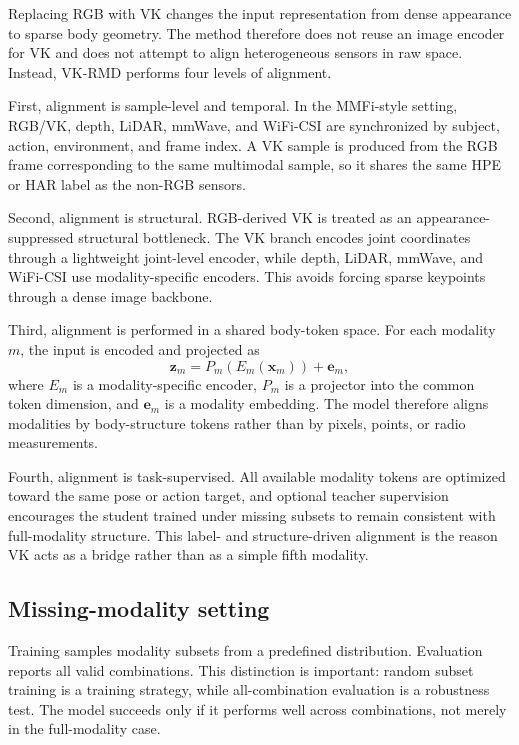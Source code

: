 \documentclass[preprint,12pt]{elsarticle}
\newcommand{\method}{VK-RMD}
\begin{document}
Replacing RGB with VK changes the input representation from dense appearance to sparse body geometry. The method therefore does not reuse an image encoder for VK and does not attempt to align heterogeneous sensors in raw space. Instead, \method{} performs four levels of alignment.

First, alignment is sample-level and temporal. In the MMFi-style setting, RGB/VK, depth, LiDAR, mmWave, and WiFi-CSI are synchronized by subject, action, environment, and frame index. A VK sample is produced from the RGB frame corresponding to the same multimodal sample, so it shares the same HPE or HAR label as the non-RGB sensors.

Second, alignment is structural. RGB-derived VK is treated as an appearance-suppressed structural bottleneck. The VK branch encodes joint coordinates through a lightweight joint-level encoder, while depth, LiDAR, mmWave, and WiFi-CSI use modality-specific encoders. This avoids forcing sparse keypoints through a dense image backbone.

Third, alignment is performed in a shared body-token space. For each modality $m$, the input is encoded and projected as
\begin{equation}
    \mathbf{z}_{m}=P_m(E_m(\mathbf{x}_{m}))+\mathbf{e}_{m},
\end{equation}
where $E_m$ is a modality-specific encoder, $P_m$ is a projector into the common token dimension, and $\mathbf{e}_{m}$ is a modality embedding. The model therefore aligns modalities by body-structure tokens rather than by pixels, points, or radio measurements.

Fourth, alignment is task-supervised. All available modality tokens are optimized toward the same pose or action target, and optional teacher supervision encourages the student trained under missing subsets to remain consistent with full-modality structure. This label- and structure-driven alignment is the reason VK acts as a bridge rather than as a simple fifth modality.

\subsection{Missing-modality setting}

Training samples modality subsets from a predefined distribution. Evaluation reports all valid combinations. This distinction is important: random subset training is a training strategy, while all-combination evaluation is a robustness test. The model succeeds only if it performs well across combinations, not merely in the full-modality case.
\end{document}
